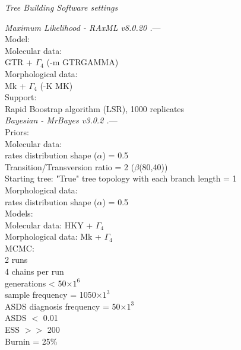 \documentclass[12pt,letterpaper]{article}
\renewcommand{\subsection}[1]{%
\bigskip
\begin{center}
\begin{large}
\normalfont\itshape #1
\end{large}
\end{center}}
\renewcommand{\subsubsection}[1]{%
\vspace{2ex}
\noindent
\textit{#1.}---}
\begin{document}
\subsection{Tree Building Software settings}

\subsubsection{Maximum Likelihood - RAxML v8.0.20 \citep{Stamatakis21012014}} \\
Model: \\
Molecular data: \\
GTR + $\Gamma_4$ (-m GTRGAMMA) \\
Morphological data: \\
Mk + $\Gamma_4$ (-K MK) \\
Support: \\
Rapid Boostrap algorithm (LSR), 1000 replicates \\

\subsubsection{Bayesian - MrBayes v3.0.2 \citep{Ronquist2012mrbayes}} \\
Priors: \\
Molecular data: \\
rates distribution shape ($\alpha$) = 0.5 \\
Transition/Transversion ratio = 2 ($\beta$(80,40)) \\
Starting tree: "True" tree topology with each branch length = 1 \\
Morphological data: \\
rates distribution shape ($\alpha$) = 0.5 \\
Models: \\
Molecular data: HKY + $\Gamma_4$ \\
Morphological data: Mk + $\Gamma_4$ \\
MCMC: \\
2 runs \\
4 chains per run \\
generations < 50$\times$$1^6$ \\
sample frequency = 1050$\times$$1^3$ \\
ASDS diagnosis frequency = 50$\times$$1^3$ \\
ASDS $<$ 0.01 \\
ESS $>>$ 200 \\
Burnin = 25\%
\end{document}
